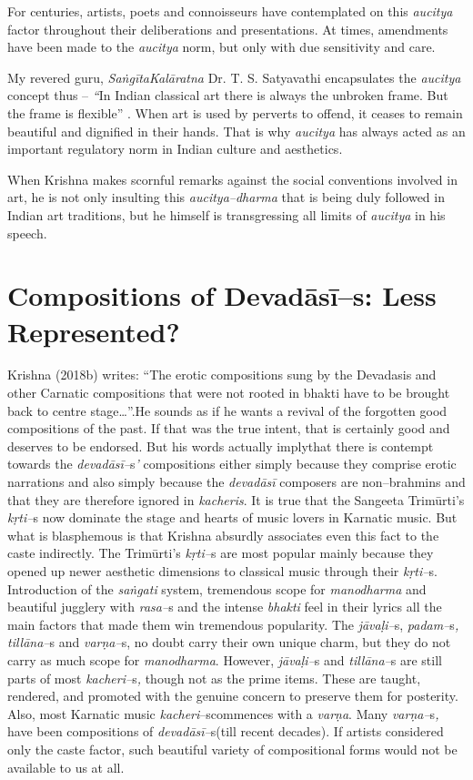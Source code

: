 For centuries, artists, poets and connoisseurs have contemplated on this \textit{aucitya} factor throughout their deliberations and presentations. At times, amendments have been made to the \textit{aucitya} norm, but only with due sensitivity and care.

My revered guru, \textit{Saṅgīta}\textit{Kalāratna} Dr. T. S. Satyavathi encapsulates the \textit{aucitya} concept thus – \textit{“}In Indian classical art there is always the unbroken frame. But the frame is flexible” . When art is used by perverts to offend, it ceases to remain beautiful and dignified in their hands. That is why \textit{aucitya} has always acted as an important regulatory norm in Indian culture and aesthetics.

When Krishna makes scornful remarks against the social conventions involved in art, he is not only insulting this \textit{aucitya–dharma} that is being duly followed in Indian art traditions, but he himself is transgressing all limits of \textit{aucitya} in his speech.


\section*{Compositions of Devadāsī–s: Less Represented?}

Krishna (2018b) writes: “The erotic compositions sung by the Devadasis and other Carnatic compositions that were not rooted in bhakti have to be brought back to centre stage…”.He sounds as if he wants a revival of the forgotten good compositions of the past. If that was the true intent, that is certainly good and deserves to be endorsed. But his words actually implythat there is contempt towards the \textit{devadāsī–}s\textit{’} compositions either simply because they comprise erotic narrations and also simply because the \textit{devadāsī} composers are non–brahmins and that they are therefore ignored in \textit{kacheris}. It is true that the Sangeeta Trimūrti’s \textit{kṛti–}s now dominate the stage and hearts of music lovers in Karnatic music. But what is blasphemous is that Krishna absurdly associates even this fact to the caste indirectly. The Trimūrti’s \textit{kṛti–}s are most popular mainly because they opened up newer aesthetic dimensions to classical music through their \textit{kṛti–}s. Introduction of the \textit{saṅgati} system, tremendous scope for \textit{manodharma} and beautiful jugglery with \textit{rasa–}s and the intense \textit{bhakti} feel in their lyrics all the main factors that made them win tremendous popularity. The \textit{jāvaḷi–}s, \textit{padam–}s\textit{, tillāna–}s and \textit{varṇa–}s, no doubt carry their own unique charm, but they do not carry as much scope for \textit{manodharma}. However, \textit{jāvaḷi–}s and \textit{tillāna–}s are still parts of most \textit{kacheri–}s\textit{,} though not as the prime items. These are taught, rendered, and promoted with the genuine concern to preserve them for posterity. Also, most Karnatic music \textit{kacheri}–scommences with a \textit{varṇa}. Many \textit{varṇa–}s\textit{,} have been compositions of \textit{devadāsī–}s(till recent decades). If artists considered only the caste factor, such beautiful variety of compositional forms would not be available to us at all.


